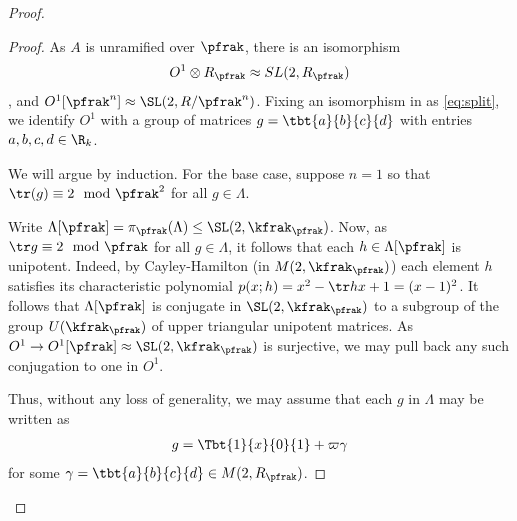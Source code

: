 \begin{proof}
\begin{proof}
    As $A$ is unramified over $\pfrak$, there is an isomorphism
    \begin{align}\label{eq:split}
      O^1 \otimes R_\pfrak \approx SL(2,R_\pfrak)
    \end{align}, and $O^1[\pfrak^n] \approx \SL(2,R/\pfrak^n)$. Fixing an isomorphism in as \ref{eq:split}, we identify $O^1$ with a group of matrices $g = \tbt{a}{b}{c}{d}$ with entries $a,b,c,d \in \R_k$.

    We will argue by induction. For the base case, suppose $n=1$ so that $\tr(g) \equiv 2 \mod \pfrak^2$ for all $g \in \Lambda$.


    Write $\Lambda[\pfrak] = \pi_{\pfrak}(\Lambda)\leq \SL(2,\kfrak_\pfrak)$. Now, as $\tr g \equiv 2 \mod \pfrak$ for all $g \in \Lambda$, it follows that each $h \in \Lambda[\pfrak]$ is unipotent.
    Indeed, by Cayley-Hamilton (in $M(2,\kfrak_\pfrak)$) each element $h$ satisfies its characteristic polynomial $p(x;h)=x^2 - \tr h x + 1= (x-1)^2$.
    It follows that $\Lambda[\pfrak]$ is conjugate in $\SL(2,\kfrak_\pfrak)$ to a subgroup of the group $U(\kfrak_\pfrak)$ of upper triangular unipotent matrices. As $O^1 \to O^1[\pfrak]\approx \SL(2,\kfrak_\pfrak)$ is surjective, we may pull back any such conjugation to one in $O^1$.

    Thus, without any loss of generality, we may assume that each $g$ in $\Lambda$ may be written as
    \begin{align*}
      g = \Tbt{1}{x}{0}{1} + \varpi \gamma
    \end{align*}
    for some $\gamma = \tbt{a}{b}{c}{d} \in M(2, R_\pfrak)$.


\end{proof}
\end{proof}
